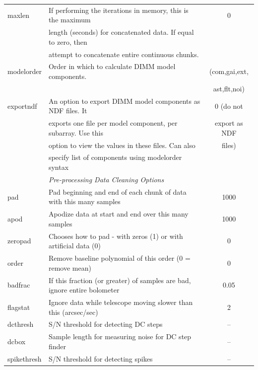 \documentclass[oneside,11pt]{starlink}
\begin{document}
\begin{table}
\begin{tabular}{llc}
maxlen           & If performing the iterations in memory, this is the maximum         &    0 \\
                 & length (seconds) for concatenated data. If equal to zero, then      & \\
                 & attempt to concatenate entire continuous chunks.                    & \\
modelorder       & Order in which to calculate DIMM model components.                  & (com,gai,ext,\\
                 &                                                                     &  ast,flt,noi)\\
exportndf        & An option to export DIMM model components as NDF files. It          & 0 (do not\\
                 & exports one file per model component, per subarray. Use this        & export as NDF\\
                 & option to view the values in these files. Can also      & files)\\
                 & specify list of components using modelorder syntax                  & \\
\hline
                 & \multicolumn{2}{l}{\em Pre-processing Data Cleaning Options} \\
\hline
pad              & Pad beginning and end of each chunk of data with this many samples          & 1000 \\
apod             & Apodize data at start and end over this many samples                & 1000 \\
zeropad          & Chooses how to pad - with zeros (1) or with artificial data (0)     & 0 \\
order            & Remove baseline polynomial of this order (0 = remove mean)          & 0 \\
badfrac          & If this fraction (or greater) of samples are bad, ignore entire bolometer            & 0.05 \\
flagstat         & Ignore data while telescope moving slower than this (arcsec/sec)    & 2 \\
dcthresh         & S/N threshold for detecting DC steps                                & -- \\
dcbox            & Sample length for measuring noise for DC step finder                & -- \\
spikethresh      & S/N threshold for detecting spikes                                  & -- \\

\end{tabular}
\end{table}
\end{document}
